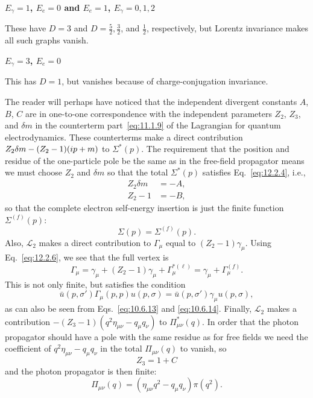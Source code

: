 \par\noindent\textbf{$E_\gamma=1$, $E_e=0$ and $E_e=1$, $E_\gamma=0,1,2$}\par
These have $D=3$ and $D=\tfrac52,\tfrac32$, and $\tfrac12$, respectively,
but Lorentz invariance makes all such graphs vanish.

\par\noindent\textbf{$E_\gamma=3$, $E_e=0$}\par
This has $D=1$, but vanishes because of charge-conjugation invariance.

The reader will perhaps have noticed that the independent divergent
constants $A$, $B$, $C$ are in one-to-one correspondence with the independent
parameters $Z_2$, $Z_3$, and $\delta m$ in the counterterm
part~\eqref{eq:11.1.9} of
the Lagrangian for quantum electrodynamics. These counterterms make a direct
contribution $Z_2\delta m-(Z_2-1)(i\sl{p}+m)$ to $\Sigma^*(p)$. The
requirement that the position and residue of the one-particle pole be the
same as in the free-field propagator means we must choose $Z_2$ and
$\delta m$ so that the total $\Sigma^*(p)$ satisfies Eq.~\eqref{eq:12.2.4},
i.e.,
\begin{align}
  Z_2\delta m&=-A,
  \tag{12.2.9}\label{eq:12.2.9}\\
  Z_2-1&=-B,
  \tag{12.2.10}\label{eq:12.2.10}
\end{align}
so that the complete electron self-energy insertion is just the finite
function $\Sigma^{(f)}(p)$:
\begin{equation}
  \Sigma(p)=\Sigma^{(f)}(p).
  \tag{12.2.11}\label{eq:12.2.11}
\end{equation}
Also, $\mathcal{L}_2$ makes a direct contribution to $\Gamma_\mu$ equal to
$(Z_2-1)\gamma_\mu$. Using Eq.~\eqref{eq:12.2.6}, we see that the full
vertex is
\begin{equation}
  \Gamma_\mu=\gamma_\mu+(Z_2-1)\gamma_\mu+\Gamma_\mu^{*(\ell)}
  =\gamma_\mu+\Gamma_\mu^{(f)}.
  \tag{12.2.12}\label{eq:12.2.12}
\end{equation}
This is not only finite, but satisfies the condition
\begin{equation}
  \bar u(p,\sigma')\Gamma_\mu(p,p)u(p,\sigma)
  =\bar u(p,\sigma')\gamma_\mu u(p,\sigma),
  \tag{12.2.13}\label{eq:12.2.13}
\end{equation}
as can also be seen from Eqs.~\eqref{eq:10.6.13} and
\eqref{eq:10.6.14}. Finally,
$\mathcal{L}_2$ makes a contribution
$-(Z_3-1)(q^2\eta_{\mu\nu}-q_\mu q_\nu)$ to $\Pi_{\mu\nu}^*(q)$. In order
that the photon propagator should have a pole with the same residue as for
free fields we need the coefficient of $q^2\eta_{\mu\nu}-q_\mu q_\nu$ in
the total $\Pi_{\mu\nu}(q)$ to vanish, so
\begin{equation}
  Z_3=1+C
  \tag{12.2.14}\label{eq:12.2.14}
\end{equation}
and the photon propagator is then finite:
\begin{equation}
  \Pi_{\mu\nu}(q)=(\eta_{\mu\nu}q^2-q_\mu q_\nu)\pi(q^2).
  \tag{12.2.15}\label{eq:12.2.15}
\end{equation}


